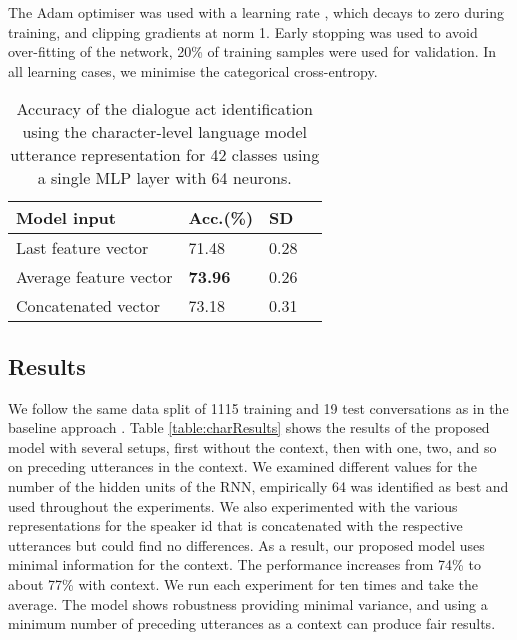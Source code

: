 \documentclass[10pt, a4paper]{article}
\begin{document}
The Adam optimiser \cite{kingma2014adam} was used with a learning rate , which decays to zero during training, and clipping gradients at norm 1.  
Early stopping was used to avoid over-fitting of the network, 20\% of training samples were used for validation. 
In all learning cases, we minimise the categorical cross-entropy. 

\begin{table}[t]
\centering
\caption{Accuracy of the dialogue act identification using the character-level language model utterance representation for 42 classes using a single MLP layer with 64 neurons.}
\begin{tabular}{llll}
\hline
Model input                       &    Acc.(\%) & SD   \\

\hline
Last feature vector               &     71.48  & 0.28   \\
Average feature vector            & \bf 73.96  & 0.26  \\
Concatenated vector  \hspace{1cm} &     73.18  & 0.31   \\
\hline
\end{tabular}
\label{table:OldCharResults}
\end{table}

\subsection{Results}
We follow the same data split of 1115 training and 19 test conversations as in the baseline approach \cite{stolcke2000dialogue,kalchbrenner2013recurrent}.
Table \ref{table:charResults} shows the results of the proposed model with several setups, first without the context, then with one, two, and so on preceding utterances in the context.
We examined different values for the number of the hidden units of the RNN, empirically 64 was identified as best and used throughout the experiments. 
We also experimented with the various representations for the speaker id that is concatenated with the respective utterances but could find no differences. 
As a result, our proposed model uses minimal information for the context.
The performance increases from 74\% to about 77\% with context. 
We run each experiment for ten times and take the average.
The model shows robustness providing minimal variance, and using a minimum number of preceding utterances as a context can produce fair results.
\end{document}
